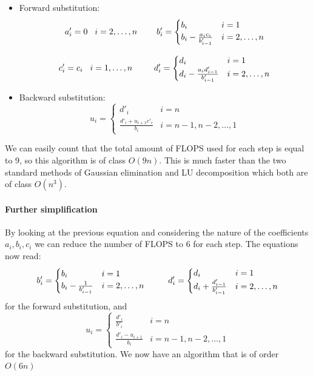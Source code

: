 \documentclass[10pt,a4paper,titlepage]{article}
\begin{document}
\begin{itemize} 
\item Forward substitution:
\[
	a'_i = 0 \hspace{0.3cm} i = 2, \dots, n \hspace{0.8cm} 
    b'_i = \begin{cases} 
			b_i  & i=1 \\
			b_i - \frac{a_i c_i}{ b'_{i-1}} & i=2,\dots,n 
		\end{cases}
\]

\[
	c'_i = c_i \hspace{0.3cm} i = 1, \dots, n \hspace{0.9cm} 
	d'_i= \begin{cases} 
					d_i  & i=1 \\
					d_i - \frac{a_i d'_{i-1}}{b'_{i-1}} & i=2,\dots,n
				\end{cases}
\]

\item Backward substitution:
\[
	u_i = \begin{cases} 
			d'_i  & i = n \\
			\frac{d'_i + u_{i+1} c'_i}{b_i} & i=n-1,n-2,\dots,1 
		\end{cases}
\]
\end{itemize}

We can easily count that the total amount of FLOPS used for each step is equal to 9, so this algorithm is of class $O(9n)$. This is much faster than the two standard methods of Gaussian elimination and LU decomposition which both are of class $O(n^3)$.
\paragraph{Further simplification}
By looking at the previous equation and considering the nature of the coefficients $a_i,b_i,c_i$ we can reduce the number of FLOPS to 6 for each step.
The equations now read:
\[
	b'_i= \begin{cases} 
					b_i  & i=1 \\
					b_i - \frac{1}{b'_{i-1}} & i=2,\dots,n
				\end{cases}	
                \hspace{0.9cm} 
	d'_i= \begin{cases} 
					d_i  & i=1 \\
					d_i + \frac{d'_{i-1}}{b'_{i-1}} & i=2,\dots,n
				\end{cases}
\] for the forward substitution, and 
\[
	u_i = \begin{cases} 
			\frac{d'_i}{b'_i}   & i = n \\
			\frac{d'_i - u_{i+1} }{b_i} & i=n-1,n-2,\dots,1 
		\end{cases}
\] for the backward substitution. We now have an algorithm that is of order $O(6n)$ 
\end{document}
